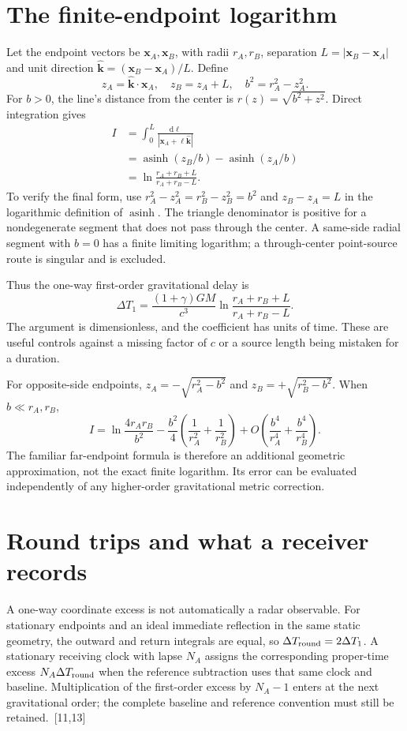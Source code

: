 \documentclass[10pt,twocolumn,letterpaper]{article}
\newcommand{\dd}{\mathrm{d}}
\begin{document}
\section{The finite-endpoint logarithm}
Let the endpoint vectors be $\mathbf x_A,\mathbf x_B$, with radii $r_A,r_B$, separation $L=|\mathbf x_B-\mathbf x_A|$ and unit direction $\widehat{\mathbf k}=(\mathbf x_B-\mathbf x_A)/L$. Define
\[
 z_A=\widehat{\mathbf k}\cdot\mathbf x_A,\quad z_B=z_A+L,
 \quad b^2=r_A^2-z_A^2.
\]
For $b>0$, the line's distance from the center is $r(z)=\sqrt{b^2+z^2}$. Direct integration gives
\[
\begin{aligned}
 I&=\int_0^L\frac{\dd\ell}{|\mathbf x_A+\ell\widehat{\mathbf k}|}\\
 &=\operatorname{asinh}(z_B/b)-\operatorname{asinh}(z_A/b)\\
 &=\ln\frac{r_A+r_B+L}{r_A+r_B-L}.
\end{aligned}
\]
To verify the final form, use $r_A^2-z_A^2=r_B^2-z_B^2=b^2$ and $z_B-z_A=L$ in the logarithmic definition of $\operatorname{asinh}$. The triangle denominator is positive for a nondegenerate segment that does not pass through the center. A same-side radial segment with $b=0$ has a finite limiting logarithm; a through-center point-source route is singular and is excluded.

Thus the one-way first-order gravitational delay is
\begin{equation}
 \Delta T_1=\frac{(1+\gamma)GM}{c^3}
 \ln\frac{r_A+r_B+L}{r_A+r_B-L}.
 \label{eq:finite-road}
\end{equation}
The argument is dimensionless, and the coefficient has units of time. These are useful controls against a missing factor of $c$ or a source length being mistaken for a duration.

For opposite-side endpoints, $z_A=-\sqrt{r_A^2-b^2}$ and $z_B=+\sqrt{r_B^2-b^2}$. When $b\ll r_A,r_B$,
\[
 I=\ln\frac{4r_Ar_B}{b^2}
 -\frac{b^2}{4}\left(\frac 1{r_A^2}+\frac 1{r_B^2}\right)
 +O\!\left(\frac{b^4}{r_A^4}+\frac{b^4}{r_B^4}\right).
\]
The familiar far-endpoint formula is therefore an additional geometric approximation, not the exact finite logarithm. Its error can be evaluated independently of any higher-order gravitational metric correction.


\section{Round trips and what a receiver records}
A one-way coordinate excess is not automatically a radar observable. For stationary endpoints and an ideal immediate reflection in the same static geometry, the outward and return integrals are equal, so $\Delta T_{\rm round}=2\Delta T_1$. A stationary receiving clock with lapse $N_A$ assigns the corresponding proper-time excess $N_A\Delta T_{\rm round}$ when the reference subtraction uses that same clock and baseline. Multiplication of the first-order excess by $N_A-1$ enters at the next gravitational order; the complete baseline and reference convention must still be retained.~[11,13]
\end{document}
